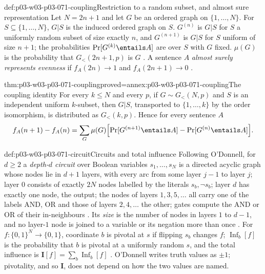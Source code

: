 \begin{hbdefinition}{def:p03-w03-p03-071-coupling}{Restriction to a random subset, and almost sure representation}
Let \(N=2n+1\) and let \(G\) be an ordered graph on \(\{1,\ldots,N\}\).  For
\(S\subseteq\{1,\ldots,N\}\), \(G|S\) is the induced ordered graph on \(S\).
\(G^{(n)}\) is \(G|S\) for \(S\) a uniformly random subset of size exactly
\(n\), and \(G^{(n+1)}\) is \(G|S\) for \(S\) uniform of size \(n+1\); the
probabilities \(\Pr[G^{(k)}\entails A]\) are over \(S\) with \(G\) fixed.
\(\mu(G)\) is the probability that \(G_<(2n+1,p)\) is \(G\)
\cite[p.~25]{Spencer2007LogicRandomStructuresAuthor}.  A sentence \(A\)
\emph{almost surely represents evenness} if \(f_A(2n)\to1\) and
\(f_A(2n+1)\to0\) \cite[p.~25]{Spencer2007LogicRandomStructuresAuthor}.
\end{hbdefinition}

\begin{hblemma}{thm:p03-w03-p03-071-coupling}{proved=annex:p03-w03-p03-071-coupling}{The coupling identity}
For every \(k\leq N\) and every \(p\), if \(G\sim G_<(N,p)\) and \(S\) is an
independent uniform \(k\)-subset, then \(G|S\), transported to
\(\{1,\ldots,k\}\) by the order isomorphism, is distributed as
\(G_<(k,p)\).  Hence for every sentence \(A\)
\[
  f_A(n+1)-f_A(n)=\sum_G\mu(G)\Bigl[\Pr[G^{(n+1)}\entails A]
  -\Pr[G^{(n)}\entails A]\Bigr].
\]
\end{hblemma}

\begin{hbdefinition}{def:p03-w03-p03-071-circuit}{Circuits and total influence}
Following O'Donnell, for \(d\geq2\) a \emph{depth-\(d\) circuit} over
Boolean variables \(s_1,\ldots,s_N\) is a directed acyclic graph whose nodes
lie in \(d+1\) layers, with every arc from some layer \(j-1\) to layer
\(j\); layer \(0\) consists of exactly \(2N\) nodes labelled by the literals
\(s_b,\neg s_b\); layer \(d\) has exactly one node, the output; the nodes of
layers \(1,3,5,\ldots\) all carry one of the labels AND, OR and those of
layers \(2,4,\ldots\) the other; gates compute the AND or OR of their
in-neighbours \cite[def.~4.26, p.~103]{ODonnell2021AnalysisBooleanArxiv}.
Its \emph{size} is the number of nodes in layers \(1\) to \(d-1\), and no
layer-\(1\) node is joined to a variable or its negation more than once
\cite[def.~4.27, p.~104]{ODonnell2021AnalysisBooleanArxiv}.  For
\(f:\{0,1\}^N\to\{0,1\}\), coordinate \(b\) is pivotal at \(s\) if flipping
\(s_b\) changes \(f\); \(\operatorname{Inf}_b[f]\) is the probability that
\(b\) is pivotal at a uniformly random \(s\), and the total influence is
\(\mathbf I[f]=\sum_b\operatorname{Inf}_b[f]\)
\cite[defs.~2.12--2.13, p.~46; def.~2.27,
p.~49]{ODonnell2021AnalysisBooleanArxiv}.  O'Donnell writes truth values as
\(\pm1\); pivotality, and so \(\mathbf I\), does not depend on how the two
values are named.
\end{hbdefinition}

